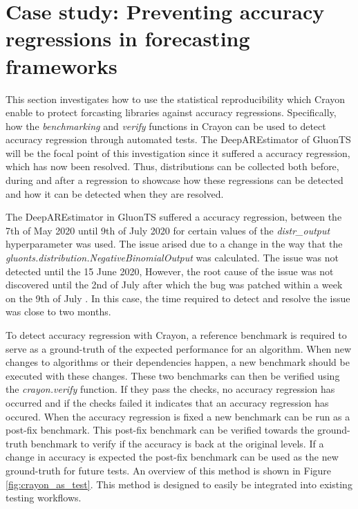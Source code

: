 \section{Case study: Preventing accuracy regressions in forecasting frameworks}
This section investigates how to use the statistical reproducibility which Crayon enable to protect forcasting libraries against accuracy regressions. Specifically, how the \textit{benchmarking} and \textit{verify} functions in Crayon can be used to detect accuracy regression through automated tests. The DeepAREstimator of GluonTS will be the focal point of this investigation since it suffered a accuracy regression, which has now been resolved. Thus, distributions can be collected both before, during and after a regression to showcase how these regressions can be detected and how it can be detected when they are resolved.

The DeepAREstimator in GluonTS suffered a accuracy regression, between the 7th of May 2020 until 9th of July 2020 for certain values of the \textit{distr\_output} hyperparameter was used. The issue arised due to a change in the way that the \textit{gluonts.distribution.NegativeBinomialOutput} was calculated. The issue was not detected until the 15 June 2020, However, the root cause of the issue was not discovered until the 2nd of July after which the bug was patched within a week on the 9th of July \cite{gluonts_deepar_bugged, gluonts_deepar_bugged_found, gluonts_deepar_patched}. In this case, the time required to detect and resolve the issue was close to two months.

To detect accuracy regression with Crayon, a reference benchmark is required to serve as a ground-truth of the expected performance for an algorithm. When new changes to algorithms or their dependencies happen, a new benchmark should be executed with these changes. These two benchmarks can then be verified using the \textit{crayon.verify} function. If they pass the checks, no accuracy regression has occurred and if the checks failed it indicates that an accuracy regression has occured. When the accuracy regression is fixed a new benchmark can be run as a post-fix benchmark. This post-fix benchmark can be verified towards the ground-truth benchmark to verify if the accuracy is back at the original levels. If a change in accuracy is expected the post-fix benchmark can be used as the new ground-truth for future tests. An overview of this method is shown in Figure \ref{fig:crayon_as_test}. This method is designed to easily be integrated into existing testing workflows.

